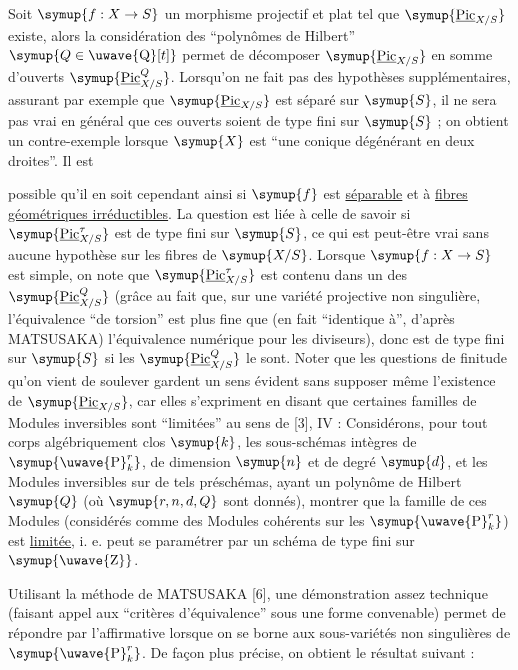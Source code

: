 
Soit $\symup{f:X\to S}$ un morphisme projectif et plat tel que
$\symup{\underline{\operatorname{Pic}}_{X/S}}$ existe, alors la considération des ``polynômes de
Hilbert'' $\symup{Q\in\text{\uwave{Q}}[t]}$ permet de décomposer
$\symup{\underline{\operatorname{Pic}}_{X/S}}$ en somme d'ouverts
$\symup{\underline{\operatorname{Pic}}_{X/S}^Q}$. Lorsqu'on ne fait pas des hypothèses
supplémentaires, assurant par exemple que $\symup{\underline{\operatorname{Pic}}_{X/S}}$ est séparé
sur $\symup{S}$, il ne sera pas vrai en général que ces ouverts soient de type fini sur
$\symup{S}$ ; on obtient un contre-exemple lorsque $\symup{X}$ est ``une conique dégénérant en
deux droites''. Il est

possible qu'il en soit cependant ainsi si $\symup{f}$ est \uline{séparable} et à \uline{fibres
géométriques irréductibles}. La question est liée à celle de savoir si
$\symup{\underline{\operatorname{Pic}}_{X/S}^\tau}$ est de type fini sur $\symup{S}$, ce qui est peut-être
vrai sans aucune hypothèse sur les fibres de $\symup{X/S}$. Lorsque
$\symup{f:X\to S}$ est simple, on note que
$\symup{\underline{\operatorname{Pic}}_{X/S}^\tau}$ est contenu dans un des
$\symup{\underline{\operatorname{Pic}}_{X/S}^Q}$ (grâce au fait que, sur une variété projective
non singulière, l'équivalence ``de torsion'' est plus fine que (en fait
``identique à'', d'après MATSUSAKA) l'équivalence numérique pour les
diviseurs), donc est de type fini sur $\symup{S}$ si les
$\symup{\underline{\operatorname{Pic}}_{X/S}^Q}$ le sont. Noter que les questions de finitude qu'on
vient de soulever gardent un sens évident sans supposer même l'existence de
$\symup{\underline{\operatorname{Pic}}_{X/S}}$, car elles s'expriment en disant que certaines
familles de Modules inversibles sont ``limitées'' au sens de [3], IV :
Considérons, pour tout corps algébriquement clos $\symup{k}$, les sous-schémas intègres
de $\symup{\text{\uwave{P}}_k^r}$, de dimension $\symup{n}$ et de degré $\symup{d}$, et les Modules
inversibles sur de tels préschémas, ayant un polynôme de Hilbert $\symup{Q}$ (où
$\symup{r,n,d,Q}$ sont donnés), montrer que la famille de ces Modules (considérés
comme des Modules cohérents sur les $\symup{\text{\uwave{P}}_k^r}$) est \uline{limitée}, i. e. peut se
paramétrer par un schéma de type fini sur $\symup{\text{\uwave{Z}}}$.

Utilisant la méthode de MATSUSAKA [6], une démonstration assez technique
(faisant appel aux ``critères d'équivalence'' sous une forme convenable) permet
de répondre par l'affirmative lorsque on se borne aux sous-variétés non
singulières de $\symup{\text{\uwave{P}}_k^r}$. De façon plus précise, on obtient le résultat
suivant :

